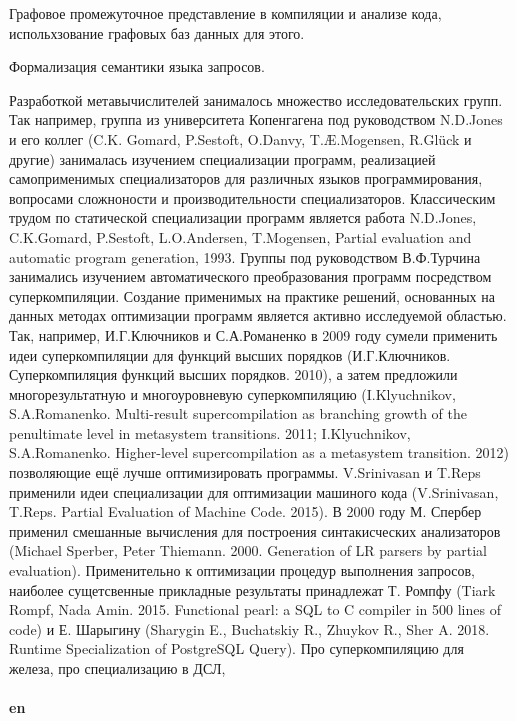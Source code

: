 \documentclass[12pt]{article}  %
\theoremstyle{remark}
\begin{document}
Графовое промежуточное представление в компиляции и анализе кода, испольхзование графовых баз данных для этого.

Формализация семантики языка запросов.


Разработкой метавычислителей занималось множество исследовательских групп. Так например, группа из университета Копенгагена под руководством N.D.Jones и его коллег (C.K. Gomard, P.Sestoft, O.Danvy, T.Æ.Mogensen, R.Glück и другие) занималась изучением специализации программ, реализацией самоприменимых специализаторов для различных языков программирования, вопросами сложноности и производительности специализаторов. Классическим трудом по статической специализации программ является работа N.D.Jones, C.K.Gomard, P.Sestoft, L.O.Andersen, T.Mogensen,
Partial evaluation and automatic program generation, 1993. Группы под руководством В.Ф.Турчина занимались изучением автоматического преобразования программ посредством суперкомпиляции. Создание применимых на практике решений, основанных на данных методах оптимизации программ является активно исследуемой областью. Так, например, И.Г.Ключников и С.А.Романенко в 2009 году сумели применить идеи суперкомпиляции для функций высших порядков (И.Г.Ключников. Суперкомпиляция функций высших порядков. 2010), а затем предложили многорезультатную и многоуровневую суперкомпиляцию (I.Klyuchnikov, S.A.Romanenko. Multi-result supercompilation as branching growth of the penultimate level in metasystem transitions. 2011; I.Klyuchnikov, S.A.Romanenko. Higher-level supercompilation as a metasystem transition. 2012) позволяющие ещё лучше оптимизировать программы. V.Srinivasan и T.Reps применили идеи специализации для оптимизации машиного кода (V.Srinivasan, T.Reps. Partial Evaluation of Machine Code. 2015). В 2000 году М. Спербер применил смешанные вычисления для построения синтакисческих анализаторов (Michael Sperber, Peter Thiemann. 2000. Generation of LR parsers by partial evaluation). Применительно к оптимизации процедур выполнения запросов, наиболее сущетсвенные прикладные результаты принадлежат Т. Ромпфу (Tiark Rompf, Nada Amin. 2015. Functional pearl: a SQL to C compiler in 500 lines of code) и Е. Шарыгину (Sharygin E., Buchatskiy R., Zhuykov R., Sher A. 2018. Runtime Specialization of PostgreSQL Query). Про суперкомпиляцию для железа, про специализацию в ДСЛ, 
\\
\\
\textbf{en}\\
\end{document}
